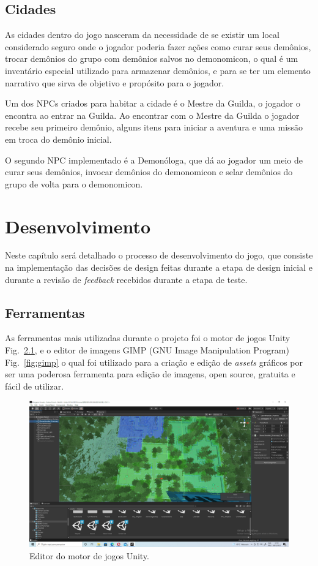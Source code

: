 \documentclass[
	12pt,				%
	openright,			%
	twoside,			%
	a4paper,			%
	english,			%
	french,				%
	spanish,			%
	brazil				%
	]{abntex2}
\begin{document}
\section{Cidades}\label{cidades}

As cidades dentro do jogo nasceram da necessidade de se existir um local considerado seguro onde o jogador poderia fazer ações como curar seus demônios, trocar demônios do grupo com demônios salvos no demonomicon, o qual é um inventário especial utilizado para armazenar demônios, e para se ter um elemento narrativo que sirva de objetivo e propósito para o jogador.
	
	Um dos NPCs criados para habitar a cidade é o Mestre da Guilda, o jogador o encontra ao entrar na Guilda. Ao encontrar com o Mestre da Guilda o jogador recebe seu primeiro demônio, alguns itens para iniciar a aventura e uma missão em troca do demônio inicial.

	O segundo NPC implementado é a Demonóloga, que dá ao jogador um meio de curar seus demônios, invocar demônios do demonomicon e selar demônios do grupo de volta para o demonomicon.

\chapter{Desenvolvimento}

Neste capítulo será detalhado o processo de desenvolvimento do jogo, que consiste na implementação das decisões de design feitas durante a etapa de design inicial e durante a revisão de \emph{feedback} recebidos durante a etapa de teste.

\section{Ferramentas}

As ferramentas mais utilizadas durante o projeto foi o motor de jogos Unity Fig.~\ref{fig:editor}, e o editor de imagens GIMP (GNU Image Manipulation Program) Fig.~\ref{fig:gimp} o qual foi utilizado para a criação e edição de \emph{assets} gráficos por ser uma poderosa ferramenta para edição de imagens, open source, gratuita e fácil de utilizar.

\begin{figure}[h!]
 \centering
  \includegraphics[width=0.70\linewidth]{unityeditor.jpg}
  \caption{Editor do motor de jogos Unity.}
  \label{fig:editor}
\end{figure}
\end{document}
